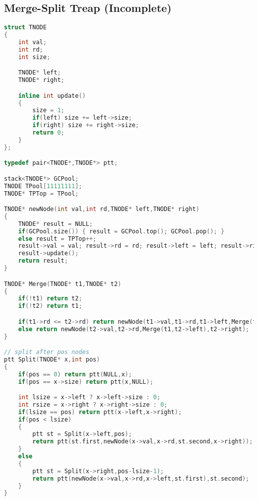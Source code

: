 \subsection{Merge-Split Treap (Incomplete)}
\begin{lstlisting}[language=C++]
struct TNODE
{
	int val;
	int rd;
	int size;

	TNODE* left;
	TNODE* right;

	inline int update()
	{
		size = 1;
		if(left) size += left->size;
		if(right) size += right->size;
		return 0;
	}
};

typedef pair<TNODE*,TNODE*> ptt;

stack<TNODE*> GCPool;
TNODE TPool[11111111];
TNODE* TPTop = TPool;

TNODE* newNode(int val,int rd,TNODE* left,TNODE* right)
{
	TNODE* result = NULL;
	if(GCPool.size()) { result = GCPool.top(); GCPool.pop(); }
	else result = TPTop++;
	result->val = val; result->rd = rd; result->left = left; result->right = right;
	result->update();
	return result;
}

TNODE* Merge(TNODE* t1,TNODE* t2)
{
	if(!t1) return t2;
	if(!t2) return t1;

	if(t1->rd <= t2->rd) return newNode(t1->val,t1->rd,t1->left,Merge(t1->right,t2));
	else return newNode(t2->val,t2->rd,Merge(t1,t2->left),t2->right);
}

// split after pos nodes
ptt Split(TNODE* x,int pos)
{
	if(pos == 0) return ptt(NULL,x);
	if(pos == x->size) return ptt(x,NULL);

	int lsize = x->left ? x->left->size : 0;
	int rsize = x->right ? x->right->size : 0;
	if(lsize == pos) return ptt(x->left,x->right);
	if(pos < lsize)
	{
		ptt st = Split(x->left,pos);
		return ptt(st.first,newNode(x->val,x->rd,st.second,x->right));
	}
	else
	{
		ptt st = Split(x->right,pos-lsize-1);
		return ptt(newNode(x->val,x->rd,x->left,st.first),st.second);
	}
}
\end{lstlisting}
